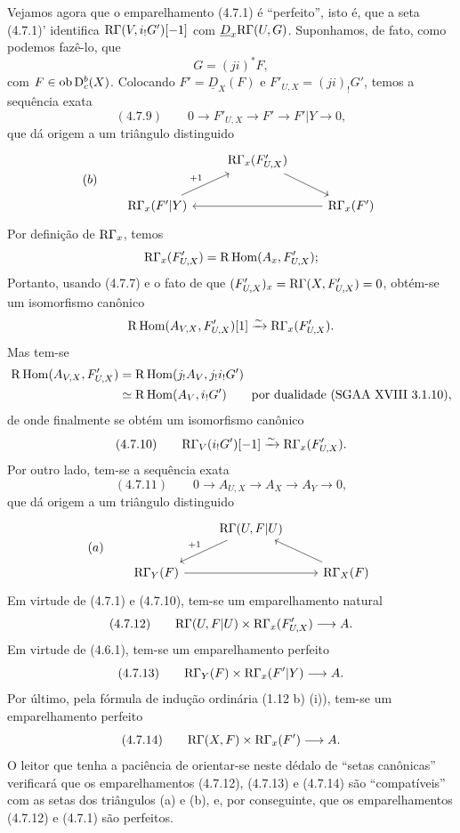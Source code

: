 Vejamos agora que o emparelhamento (4.7.1) é \textquotedblleft perfeito\textquotedblright{}, isto é, que a seta (4.7.1)' identifica $\mathrm{R}\Gamma(V,i_!G')[-1]$ com $\underline{D}_x\mathrm{R}\Gamma(U,G)$. Suponhamos, de fato, como podemos fazê-lo, que
\[
G=(ji)^*F,
\]
com $F\in\operatorname{ob}\mathrm{D}_c^b(X)$. Colocando $F'=\underline{D}_X(F)$ e $F'_{U,X}=(ji)_!G'$, temos a sequência exata
\[
(4.7.9)\qquad 0\longrightarrow F'_{U,X}\longrightarrow F'\longrightarrow F'|Y\longrightarrow0,
\]
que dá origem a um triângulo distinguido
\[
(b)\qquad
\begin{tikzcd}
& \R\Gamma_x(F'_{U,X}) \arrow[dr] \\
\R\Gamma_x(F'|Y) \arrow[ur,"{+1}"] && \R\Gamma_x(F') \arrow[ll]
\end{tikzcd}
\]
Por definição de $\mathrm{R}\Gamma_x$, temos
\[
\mathrm{R}\Gamma_x(F'_{U,X})=\mathrm{R}\operatorname{Hom}(A_x,F'_{U,X});
\]
Portanto, usando (4.7.7) e o fato de que $(F'_{U,X})_x=\mathrm{R}\Gamma(X,F'_{U,X})=0$, obtém-se um isomorfismo canônico
\[
\mathrm{R}\operatorname{Hom}(A_{V,X},F'_{U,X})[1]\xrightarrow{\sim}\mathrm{R}\Gamma_x(F'_{U,X}).
\]
Mas tem-se
\[
\begin{aligned}
\mathrm{R}\operatorname{Hom}(A_{V,X},F'_{U,X})&=\mathrm{R}\operatorname{Hom}(j_!A_V,j_!i_!G')\\
&\simeq\mathrm{R}\operatorname{Hom}(A_V,i_!G')\qquad\text{por dualidade (SGAA~XVIII~3.1.10)},
\end{aligned}
\]
de onde finalmente se obtém um isomorfismo canônico
\[
(4.7.10)\qquad \mathrm{R}\Gamma_V(i_!G')[-1]\xrightarrow{\sim}\mathrm{R}\Gamma_x(F'_{U,X}).
\]
Por outro lado, tem-se a sequência exata
\[
(4.7.11)\qquad 0\longrightarrow A_{U,X}\longrightarrow A_X\longrightarrow A_Y\longrightarrow0,
\]
que dá origem a um triângulo distinguido
\[
(a)\qquad
\begin{tikzcd}
& \R\Gamma(U,F|U) \arrow[dl,"{+1}"'] \\
\R\Gamma_Y(F) \arrow[rr] && \R\Gamma_X(F) \arrow[ul]
\end{tikzcd}
\]
Em virtude de (4.7.1) e (4.7.10), tem-se um emparelhamento natural
\[
(4.7.12)\qquad \mathrm{R}\Gamma(U,F|U)\times\mathrm{R}\Gamma_x(F'_{U,X})\longrightarrow A.
\]
Em virtude de (4.6.1), tem-se um emparelhamento perfeito
\[
(4.7.13)\qquad \mathrm{R}\Gamma_Y(F)\times\mathrm{R}\Gamma_x(F'|Y)\longrightarrow A.
\]
Por último, pela fórmula de indução ordinária (1.12 b) (i)), tem-se um emparelhamento perfeito
\[
(4.7.14)\qquad \mathrm{R}\Gamma(X,F)\times\mathrm{R}\Gamma_x(F')\longrightarrow A.
\]
O leitor que tenha a paciência de orientar-se neste dédalo de \textquotedblleft setas canônicas\textquotedblright{} verificará que os emparelhamentos (4.7.12), (4.7.13) e (4.7.14) são \textquotedblleft compatíveis\textquotedblright{} com as setas dos triângulos (a) e (b), e, por conseguinte, que os emparelhamentos (4.7.12) e (4.7.1) são perfeitos.


